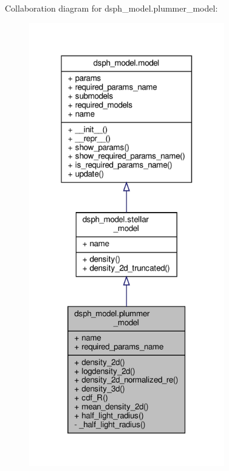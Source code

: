 Collaboration diagram for dsph\+\_\+model.\+plummer\+\_\+model\+:\nopagebreak
\begin{figure}[H]
\begin{center}
\leavevmode
\includegraphics[width=241pt]{d2/dbe/classdsph__model_1_1plummer__model__coll__graph}
\end{center}
\end{figure}
